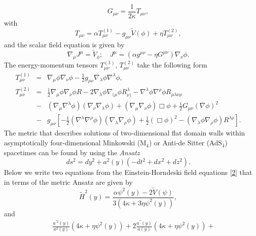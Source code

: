 \documentclass[aps,12pt, a4paper,nofootinbib]{revtex4}
\begin{document}
{\begin{equation}
G_{\mu\nu}=\frac{1}{2\kappa}T_{\mu\nu},\label{2}
\end{equation}
with 
\begin{equation}\label{Tmn}
T_{\mu\nu}=\alpha T^{(1)}_{\mu\nu}-g_{\mu\nu}\tilde{V}(\phi)+\eta T^{(2)}_{\mu\nu},
\end{equation}
and the scalar field equation is given by
\begin{equation}
\nabla_{\mu}J^{\mu}=\tilde{V}_{\phi};\quad J^{\mu}=(\alpha g^{\mu\nu}-\eta G^{\mu\nu})\nabla_{\nu}\phi.\label{3}
\end{equation}
The energy-momentum tensors $T^{(1)}_{\mu\nu}$, $T^{(2)}_{\mu\nu}$ take the following form
\begin{eqnarray}
T^{(1)}_{\mu\nu}&=&\nabla_{\mu}\phi\nabla_{\nu}\phi-\frac{1}{2}g_{\mu\nu}\nabla_{\lambda}\phi\nabla^{\lambda}\phi,\label{4}\\
T^{(2)}_{\mu\nu}&=&\frac{1}{2}\nabla_{\mu}\phi\nabla_{\nu}\phi R-2\nabla_{\lambda}\phi\nabla_{(\mu}\phi R^{\lambda}_{\nu)}-\nabla^{\lambda}\phi\nabla^{\rho}\phi R_{\mu\lambda\nu\rho}\nonumber\\
              &-&(\nabla_{\mu}\nabla^{\lambda}\phi)(\nabla_{\nu}\nabla_{\lambda}\phi)+(\nabla_{\mu}\nabla_{\nu}\phi)\Box\phi+\frac{1}{2}G_{\mu\nu}(\nabla\phi)^{2}\nonumber\\
							&-& g_{\mu\nu}\left[-\frac{1}{2}(\nabla^{\lambda}\nabla^{\rho}\phi)(\nabla_{\lambda}\nabla_{\rho}\phi)+\frac{1}{2}(\Box\phi)^{2}-(\nabla_{\lambda}\phi\nabla_{\rho}\phi)R^{\lambda\rho}\right].\label{5}							
\end{eqnarray}
The metric that describes solutions of two-dimensional flat domain walls within asymptotically four-dimensional Minkowski (M$_{4}$) or Anti-de Sitter (AdS$_{4}$) spacetimes  can be found by using the {\it Ansatz} \cite{Cvetic:1996vr}
\begin{equation}
ds^{2}=dy^{2}+a^{2}(y)(-dt^{2}+dx^{2}+dz^{2}).\label{6}
\end{equation}
Below we write two equations from the Einstein-Horndeski field equations \eqref{2} that in terms of the metric Ansatz are given by
\begin{equation}
\tilde{H}^{2}(y)=\frac{\alpha\psi^{2}(y)-2\tilde{V}(\psi)}{3(4\kappa+3\eta\psi^{2}(y))},\label{7}
\end{equation}
and
\begin{eqnarray}
&&{\frac{a^{'2}(y)}{a^{2}(y)}\left(4\kappa+\eta\psi^{2}(y)\right)+2\frac{a^{''}(y)}{a(y)}(4\kappa+\eta\psi^{2}(y))+}\nonumber\\

\end{eqnarray}}
\end{document}
